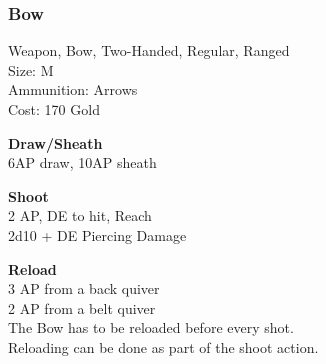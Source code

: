 \subsubsection{Bow}\label{weapon:bow}
Weapon, Bow, Two-Handed, Regular, Ranged\\
Size: M\\
Ammunition: Arrows\\
Cost: 170 Gold

\textbf{Draw/Sheath}\\
6AP draw, 10AP sheath

\textbf{Shoot}\\
2 AP, DE to hit,  Reach\\
2d10 + \texttimes DE Piercing Damage

\textbf{Reload}\\
3 AP from a back quiver\\
2 AP from a belt quiver\\
The Bow has to be reloaded before every shot.\\
Reloading can be done as part of the shoot action.